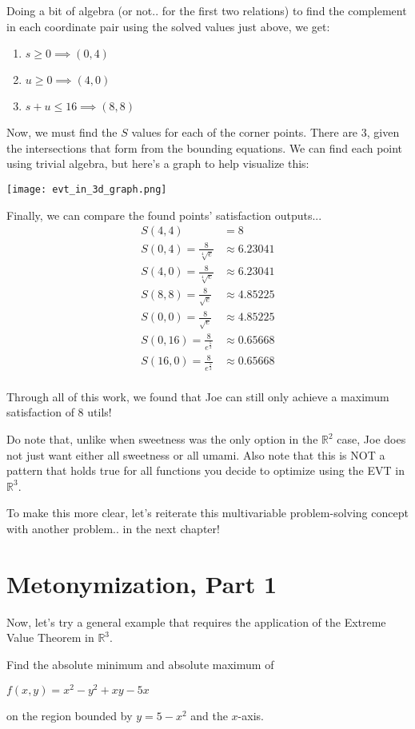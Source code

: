 \pagebreak
Doing a bit of algebra (or not.. for the first two relations) to find the complement in each coordinate pair using the solved values just above, we get:
\begin{enumerate}
	\item $s\geq 0\implies (0, 4)$
	\item $u\geq 0\implies (4, 0)$
	\item $s+u\leq 16\implies (8, 8)$
\end{enumerate}
Now, we must find the $S$ values for each of the corner points.
There are 3, given the intersections that form from the bounding equations.
We can find each point using trivial algebra, but here's a graph to help visualize this:\\
\begin{center}
	\texttt{[image: evt\_in\_3d\_graph.png]}
\end{center}

Finally, we can compare the found points' satisfaction outputs...
\begin{align*}
	S(4, 4) &= 8\\
	S(0, 4) = \frac{8}{\sqrt[4]{e}} &\approx 6.23041\\
	S(4, 0) = \frac{8}{\sqrt[4]{e}} &\approx 6.23041\\
	S(8, 8) = \frac{8}{\sqrt{e}} &\approx 4.85225\\
	S(0, 0) = \frac{8}{\sqrt{e}} &\approx 4.85225\\
	S(0, 16) = \frac{8}{e^\frac{5}{2}} &\approx 0.65668\\
	S(16, 0) = \frac{8}{e^\frac{5}{2}} &\approx 0.65668\\
\end{align*}

Through all of this work, we found that Joe can still only achieve a maximum satisfaction of $8$ utils!

Do note that, unlike when sweetness was the only option in the $\mathbb{R}^2$ case, Joe does not just want either all sweetness or all umami.
Also note that this is NOT a pattern that holds true for all functions you decide to optimize using the EVT in $\mathbb{R}^3$.

To make this more clear, let's reiterate this multivariable problem-solving concept with another problem.. in the next chapter!
\setcounter{chapter}{4}
\chapter{Metonymization, Part 1}
Now, let's try a general example that requires the application of the Extreme Value Theorem in $\mathbb{R}^3$.
\begin{eg}
	Find the absolute minimum and absolute maximum of
	\begin{center}
		$f(x, y) = x^2 - y^2 + xy - 5x$
	\end{center}
	on the region bounded by $y = 5 - x^2$ and the $x$-axis.
\end{eg}


